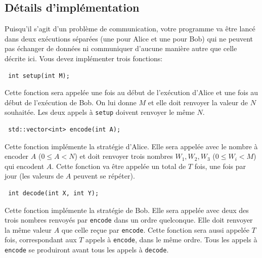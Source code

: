 \documentclass[12pt]{article}
\begin{document}
\subsection{Détails d'implémentation}
Puisqu'il s'agit d'un problème de communication, votre programme va être lancé dans deux exécutions séparées (une pour Alice et une pour Bob) qui ne peuvent pas échanger de données ni communiquer d'aucune manière autre que celle décrite ici. Vous devez implémenter trois fonctions:

\begin{lstlisting}
 int setup(int M);
\end{lstlisting}

Cette fonction sera appelée une fois au début de l'exécution d'Alice et une fois au début de l'exécution de Bob. On lui donne $M$ et elle doit renvoyer la valeur de $N$ souhaitée. Les deux appels à \texttt{setup} doivent renvoyer le même $N$.

\begin{lstlisting}
 std::vector<int> encode(int A);
\end{lstlisting}

Cette fonction implémente la stratégie d'Alice. Elle sera appelée avec le nombre à encoder $A$ ($0 \leq A < N$) et doit renvoyer trois nombres $W_1, W_2, W_3$ ($0 \leq W_i < M$) qui encodent $A$. Cette fonction va être appelée un total de $T$ fois, une fois par jour (les valeurs de $A$ peuvent se répéter).

\begin{lstlisting}
 int decode(int X, int Y);
\end{lstlisting}

Cette fonction implémente la stratégie de Bob. Elle sera appelée avec deux des trois nombres renvoyés par \texttt{encode} dans un ordre quelconque. Elle doit renvoyer la même valeur $A$ que celle reçue par \texttt{encode}. Cette fonction sera aussi appelée $T$ fois, correspondant aux $T$ appels à \texttt{encode}, dans le même ordre. Tous les appels à \texttt{encode} se produiront avant tous les appels à \texttt{decode}.
\end{document}
